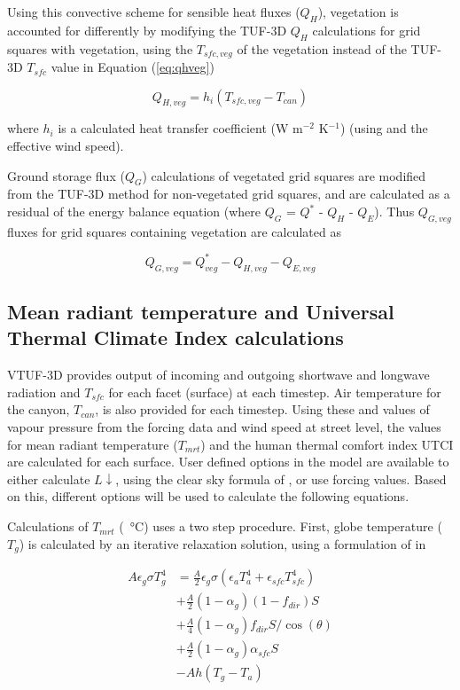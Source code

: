 \documentclass[final,3p,times,authoryear]{elsarticle}
\begin{document}
Using this convective scheme for sensible heat fluxes ($Q_{H}$), vegetation is accounted for differently by modifying the TUF-3D $Q_{H}$ calculations for grid squares with vegetation, using the $T_{sfc,veg}$ of the vegetation instead of the TUF-3D $T_{sfc}$ value in Equation (\ref{eq:qhveg})

\begin{equation}\label{eq:qhveg}
 Q_{H,veg} = h_{i}  (T_{sfc,veg}-T_{can}) 
\end{equation}

where $h_{i}$ is a calculated heat transfer coefficient (W m$^{-2}$ K$^{-1}$) (using \cite{Mascart1995} and the effective wind speed). 


Ground storage flux ($Q_{G}$) calculations of vegetated grid squares are modified from the TUF-3D method for non-vegetated grid squares, and are calculated as a residual of the energy balance equation (where $Q_{G}$ = $Q^{*}$ - $Q_{H}$ - $Q_{E}$). Thus $Q_{G,veg}$ fluxes for grid squares containing vegetation are calculated as

\begin{equation}\label{eq:qgvtuf}
 Q_{G,veg} =  Q^{*}_{veg} - Q_{H,veg} - Q_{E,veg}
\end{equation}


\subsection{Mean radiant temperature and Universal Thermal Climate Index calculations}\label{sec:tmrtutci}

VTUF-3D provides output of incoming and outgoing shortwave and longwave radiation and $T_{sfc}$ for each facet (surface) at each timestep. Air temperature for the canyon, $T_{can}$, is also provided for each timestep. Using these and values of vapour pressure from the forcing data and wind speed at street level, the values for mean radiant temperature ($T_{mrt}$) and the human thermal comfort index UTCI are calculated for each surface. User defined options in the model are available to either calculate $L\downarrow$, using the clear sky formula of \cite{Prata1996}, or use forcing values. Based on this, different options will be used to calculate the following equations.


Calculations of $T_{mrt}$ (\SI{}{\degreeCelsius}) uses a two step procedure. First, globe temperature ($T_{g}$) is calculated by an iterative relaxation solution, using a formulation of \cite{Liljegren2008} in  

\begin{equation}\label{eq:tg2}
\begin{split}
A\epsilon_{g}\sigma T_{g}^{4} &= \frac{A}{2} \epsilon_{g}\sigma( \epsilon_{a} T_{a}^{4} +  \epsilon_{sfc} T_{sfc}^{4} ) \\
&+ \frac{A}{2}( 1-\alpha_{g})(1-f_{dir})S  \\
&+ \frac{A}{4}( 1-\alpha_{g})f_{dir}S /\cos(\theta) \\
&+ \frac{A}{2}( 1-\alpha_{g})\alpha_{sfc}S \\
&- Ah(T_{g}-T_{a})   
\end{split}
\end{equation}
\end{document}
